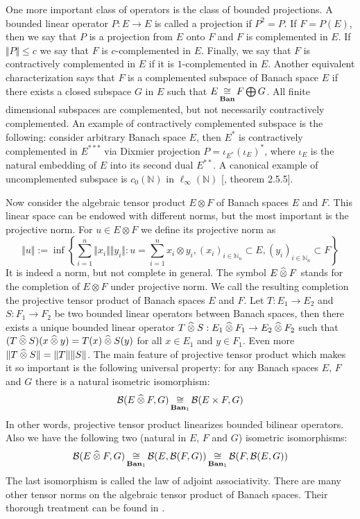 One more important class of operators is the class of bounded projections. A bounded linear operator $P:E\to E$ is called a projection if $P^2=P$. If $F=P(E)$, then we say that $P$ is a projection from $E$ onto $F$ and $F$ is complemented in $E$. If $\Vert P\Vert\leq c$ we say that $F$ is $c$-complemented in $E$. Finally, we say that $F$ is contractively complemented in $E$ if it is $1$-complemented in $E$. Another equivalent characterization says that $F$ is a complemented subspace of Banach space $E$ if there exists a closed subspace $G$ in $E$ such that $E\mathop{\mathbin{\cong}}\limits_{\mathbf{Ban}}F\bigoplus G$. All finite dimensional subspaces are complemented, but not necessarily contractively complemented. An example of contractively complemented subspace is the following: consider arbitrary Banach space $E$, then $E^*$ is contractively complemented in $E^{***}$ via Dixmier projection $P=\iota_{E^*}(\iota_E)^*$, where $\iota_E$ is the natural embedding of $E$ into its second dual $E^{**}$. A canonical example of uncomplemented subspace is $c_0(\mathbb{N})$ in $\mathbb{\ell_\infty}(\mathbb{N})$  [\cite{KalAlbTopicsBanSpTh}, theorem 2.5.5].

Now consider the algebraic tensor product $E\otimes F$ of Banach spaces $E$ and $F$. This linear space can be endowed with different norms, but the most important is the projective norm. For $u\in E\otimes F$ we define its projective norm as
$$
\Vert u\Vert:=\inf\left\{\sum_{i=1}^n \Vert x_i\Vert\Vert y_i\Vert: u=\sum_{i=1}^n x_i\otimes y_i, (x_i)_{i\in\mathbb{N}_n}\subset E, (y_i)_{i\in\mathbb{N}_n}\subset F\right\}
$$
It is indeed a norm, but not complete in general. The symbol $E\mathbin{\widehat{\otimes}} F$ stands for the completion of $E\otimes F$ under projective norm. We call the resulting completion the projective tensor product of Banach spaces $E$ and $F$. Let $T:E_1\to E_2$ and $S:F_1\to F_2$ be two bounded linear operators between Banach spaces, then there exists a unique bounded linear operator $T\mathbin{\widehat{\otimes}} S:E_1\mathbin{\widehat{\otimes}} F_1\to E_2\mathbin{\widehat{\otimes}} F_2$ such that $(T\mathbin{\widehat{\otimes}} S)(x\mathbin{\widehat{\otimes}} y)=T(x)\mathbin{\widehat{\otimes}} S(y)$ for all $x\in E_1$ and $y\in F_1$. Even more $\Vert T\mathbin{\widehat{\otimes}} S\Vert=\Vert T\Vert\Vert S\Vert$. The main feature of projective tensor product which makes it so important is the following universal property: for any Banach spaces $E$, $F$ and $G$ there is a natural isometric isomorphism:
$$
\mathcal{B}(E\mathbin{\widehat{\otimes}} F,G)\mathop{\mathbin{\cong}}\limits_{\mathbf{Ban}_1}\mathcal{B}(E\times F,G)
$$
In other words, projective tensor product linearizes bounded bilinear operators. Also we have the following two (natural in $E$, $F$ and $G$) isometric isomorphisms:
$$
\mathcal{B}(E\mathbin{\widehat{\otimes}} F,G)
\mathop{\mathbin{\cong}}\limits_{\mathbf{Ban}_1}\mathcal{B}(E,\mathcal{B}(F,G))
\mathop{\mathbin{\cong}}\limits_{\mathbf{Ban}_1}\mathcal{B}(F,\mathcal{B}(E,G))
$$
The last isomorphism is called the law of adjoint associativity. There are many other tensor norms on the algebraic tensor product of Banach spaces. Their thorough treatment can be found in \cite{DiestMetTheoryOfTensProd}.

